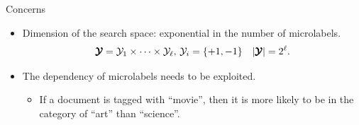 \documentclass[first=dgreen,second=purple,logo=yellowexc]{aaltoslides}
\begin{document}
%
\begin{frame}{Concerns}
	\begin{itemize}\footnotesize
		\item Dimension of the search space: exponential in the number of microlabels.
		\begin{align*}
			\pmb {\mathcal{Y}}=\mathcal{Y}_1\times\cdots\times\mathcal{Y}_{\ell},\,\mathcal{Y}_i=\{+1,-1\}\quad|\pmb {\mathcal{Y}}| = 2^{\ell}.
		\end{align*}
		\item The dependency of microlabels needs to be exploited.
		\begin{itemize}\footnotesize
			\item If a document is tagged with ``movie'', then it is more likely to be in the category of ``art'' than ``science''.
		\end{itemize}
	\end{itemize}
\end{frame}
\end{document}
